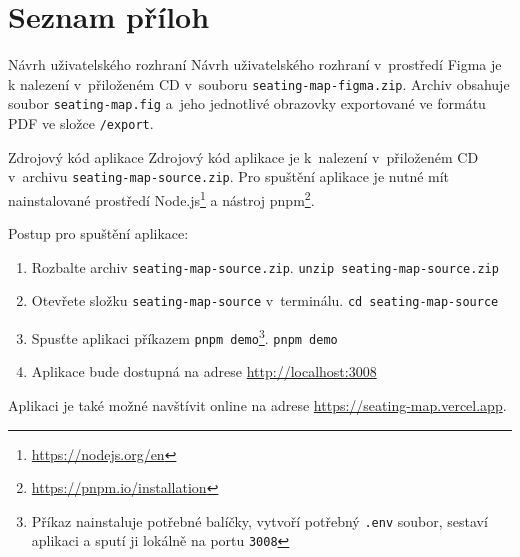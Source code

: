\appendix
{}
\chapter*{Seznam příloh}
\renewcommand{\thesection}{Příloha \Alph{section}}

\begin{section}{Návrh uživatelského rozhraní}
    Návrh uživatelského rozhraní v~prostředí Figma je k nalezení v~přiloženém CD v~souboru \texttt{seating-map-figma.zip}.
    Archiv obsahuje soubor \texttt{seating-map.fig} a~jeho jednotlivé obrazovky exportované ve formátu PDF ve složce \texttt{/export}.
\end{section}
\newpage

\begin{section}{Zdrojový kód aplikace}
    Zdrojový kód aplikace je k~nalezení v~přiloženém CD v~archivu \texttt{seating-map-source.zip}.
    Pro spuštění aplikace je nutné mít nainstalované prostředí Node.js\footnote{\url{https://nodejs.org/en}} a nástroj pnpm\footnote{\url{https://pnpm.io/installation}}.

    Postup pro spuštění aplikace:

    \begin{enumerate}
        \item Rozbalte archiv \texttt{seating-map-source.zip}.
        \subitem \texttt{unzip seating-map-source.zip}
        \item Otevřete složku \texttt{seating-map-source} v~terminálu.
        \subitem \texttt{cd seating-map-source}
        \item Spusťte aplikaci příkazem \texttt{pnpm demo}\footnote{Příkaz nainstaluje potřebné balíčky, vytvoří potřebný \texttt{.env} soubor, sestaví aplikaci a sputí ji lokálně na portu \texttt{3008}}.
        \subitem \texttt{pnpm demo}
        \item Aplikace bude dostupná na adrese \url{http://localhost:3008}
    \end{enumerate}

    Aplikaci je také možné navštívit online na adrese \url{https://seating-map.vercel.app}.
\end{section}
